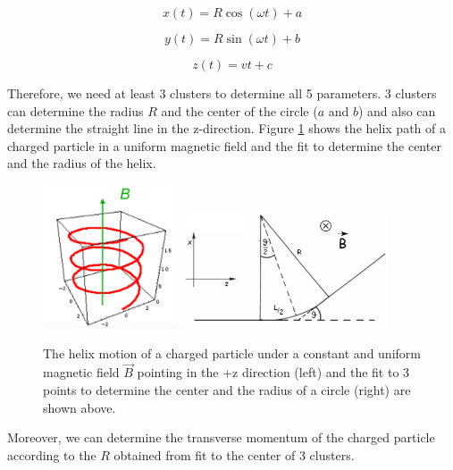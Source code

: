\begin{equation}
x(t) = R \cos(\omega t) + a
\end{equation}

\begin{equation}
y(t) = R \sin(\omega t) + b
\end{equation}

\begin{equation}
z(t) = v t + c
\end{equation}

Therefore, we need at least 3 clusters to determine all 5 parameters. 3 clusters can determine the radius $R$ and the center of the circle ($a$ and $b$) and also can determine the straight line in the z-direction. Figure \ref{HelixAndFit} shows the helix path of a charged particle in a uniform magnetic field and the fit to determine the center and the radius of the helix.


\begin{figure}[hbtp]
\begin{center}
\includegraphics[width=0.35\textwidth]{Figures/Chapter4/Helix.png}
\includegraphics[width=0.55\textwidth]{Figures/Chapter4/FitToCircle.png}
\caption{The helix motion of a charged particle under a constant and uniform magnetic field $\vec{B}$ pointing in the +z direction (left) and the fit to 3 points to determine the center and the radius of a circle (right) are shown above.}
\label{HelixAndFit}
\end{center}
\end{figure} 

Moreover, we can determine the transverse momentum of the charged particle according to the $R$ obtained from fit to the center of 3 clusters.

